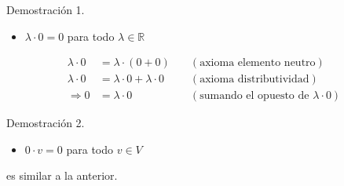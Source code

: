 \documentclass[handout]{beamer} %
\newcommand{\R}{\mathbb R}
\begin{document}
\begin{frame}
\begin{block}{Demostración 1.}\pause
\begin{itemize}
    \item $\lambda\cdot 0=0$ para todo $\lambda\in \R$ 
\end{itemize}
\begin{align*}
\lambda\cdot 0&= \lambda\cdot (0+0)&\quad (\mbox{axioma elemento neutro})\\
\lambda\cdot 0&=\lambda\cdot 0+\lambda\cdot 0
&\quad (\mbox{axioma distributividad})\\
\Rightarrow 0&=\lambda\cdot0
&\quad (\mbox{sumando el opuesto de $\lambda\cdot 0$})
\end{align*}

\end{block}
\pause
\begin{block}{Demostración 2.}\pause
\begin{itemize}
    \item $0\cdot v=0$ para todo $v\in V$
\end{itemize}
    es similar a la anterior. 
\end{block}
\end{frame}


\begin{frame}

\end{frame}
\end{document}
